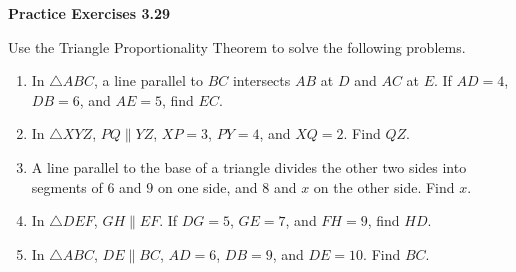 \vspace{0.3ex}
\noindent\textbf{Practice Exercises 3.29}

\vspace{0.2ex}

Use the Triangle Proportionality Theorem to solve the following problems.

\begin{enumerate}[label=\color{blue}\arabic*.]
    \item In \(\triangle ABC\), a line parallel to \(BC\) intersects \(AB\) at \(D\) and \(AC\) at \(E\). If \(AD = 4\), \(DB = 6\), and \(AE = 5\), find \(EC\).
    \item In \(\triangle XYZ\), \(PQ \parallel YZ\), \(XP = 3\), \(PY = 4\), and \(XQ = 2\). Find \(QZ\).
    \item A line parallel to the base of a triangle divides the other two sides into segments of \(6\) and \(9\) on one side, and \(8\) and \(x\) on the other side. Find \(x\).
    \item In \(\triangle DEF\), \(GH \parallel EF\). If \(DG = 5\), \(GE = 7\), and \(FH = 9\), find \(HD\).
    \item In \(\triangle ABC\), \(DE \parallel BC\), \(AD = 6\), \(DB = 9\), and \(DE = 10\). Find \(BC\).
\end{enumerate}
